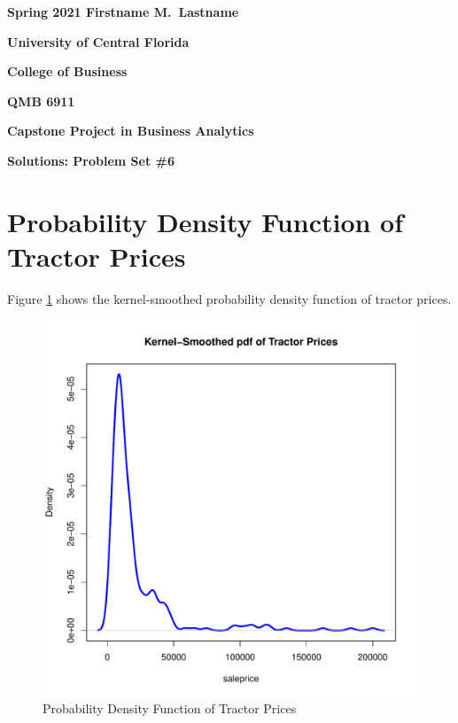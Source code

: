 \documentclass[11pt]{book}
\begin{document}

\pagestyle{empty}
{\noindent\bf Spring 2021 \hfill Firstname M.~Lastname}
\vskip 16pt
\centerline{\bf University of Central Florida}
\centerline{\bf College of Business}
\vskip 16pt
\centerline{\bf QMB 6911}
\centerline{\bf Capstone Project in Business Analytics}
\vskip 10pt
\centerline{\bf Solutions:  Problem Set \#6}
\vskip 32pt
\noindent




\pagebreak
\section*{Probability Density Function of Tractor Prices}

Figure \ref{fig:density_prices} shows  the kernel-smoothed probability density function of tractor prices.

\begin{figure}[h!]
  \centering
  \includegraphics[scale = 0.5, keepaspectratio=true]{../Figures/density_prices}
  \caption{Probability Density Function of Tractor Prices} \label{fig:density_prices}
\end{figure}
\end{document}
